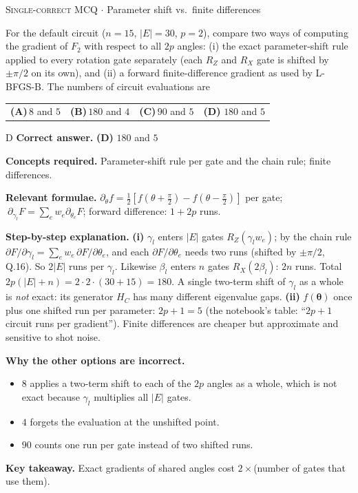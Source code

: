 \documentclass[11pt,a4paper]{article}
\newcommand{\optlabel}[1]{\textbf{(#1)}}
\newcommand{\correctlabel}[1]{\textcolor{okgreen}{\textbf{(#1)}\,\ding{51}}}
\newenvironment{qitem}[1]{\begin{list}{}{\setlength{\leftmargin}{3.3em}\setlength{\labelwidth}{3.1em}%
  \setlength{\labelsep}{0.2em}\setlength{\topsep}{3pt}\setlength{\parsep}{3pt}}\item[\textbf{Q.#1}\hfill]}{\end{list}}
\newcommand{\qsep}{\par\vspace{2pt}{\color{black!15}\hrule}\vspace{4pt}}
\newcommand{\qmeta}[2]{{\footnotesize\color{black!60}\textsc{#1} \;$\cdot$\; #2}\par}
\begin{document}
\begin{qitem}{63}
\qmeta{Single-correct MCQ}{Parameter shift vs.\ finite differences}
For the default circuit ($n = 15$, $|E| = 30$, $p = 2$), compare two ways of computing the gradient of $F_2$ with respect to
all $2p$ angles: (i) the exact parameter-shift rule applied to every rotation gate separately (each $R_Z$ and $R_X$ gate is shifted
by $\pm\pi/2$ on its own), and (ii) a forward finite-difference gradient as used by L-BFGS-B. The numbers of circuit evaluations are
\par\smallskip\noindent\begin{tabularx}{\linewidth}{@{}*{4}{L}@{}}
\optlabel{A}\,$8$ and $5$ & \optlabel{B}\,$180$ and $4$ & \optlabel{C}\,$90$ and $5$ & \correctlabel{D}\,$180$ and $5$
\end{tabularx}
\end{qitem}
\begin{solbox}{D}
\textbf{\color{brand}Correct answer.} \textcolor{okgreen}{\textbf{(D)}} $180$ and $5$

\textbf{\color{brand}Concepts required.} Parameter-shift rule per gate and the chain rule; finite differences.

\textbf{\color{brand}Relevant formulae.} $\partial_\theta f = \tfrac12[f(\theta + \tfrac\pi2) - f(\theta - \tfrac\pi2)]$ per gate; $\ \partial_{\gamma_l}F = \sum_e w_e\partial_{\theta_e}F$; forward difference: $1 + 2p$ runs.

\textbf{\color{brand}Step-by-step explanation.} \textbf{(i)} $\gamma_l$ enters $|E|$ gates $R_Z(\gamma_lw_e)$; by the chain rule $\partial F/\partial\gamma_l = \sum_e w_e\,\partial F/\partial\theta_e$, and each
$\partial F/\partial\theta_e$ needs two runs (shifted by $\pm\pi/2$, Q.16). So $2|E|$ runs per $\gamma_l$. Likewise $\beta_l$ enters $n$ gates
$R_X(2\beta_l)$: $2n$ runs. Total $2p(|E| + n) = 2\cdot2\cdot(30 + 15) = 180$.
A single two-term shift of $\gamma_l$ as a whole is \emph{not} exact: its generator $H_C$ has many different eigenvalue gaps.
\textbf{(ii)} $f(\boldsymbol\theta)$ once plus one shifted run per parameter: $2p + 1 = 5$ (the notebook's table: ``$2p+1$ circuit runs per gradient'').
Finite differences are cheaper but approximate and sensitive to shot noise.

\textbf{\color{brand}Why the other options are incorrect.}
\begin{itemize}[leftmargin=2.4em, itemsep=1pt, topsep=2pt]
\item[\textbf{(A)}] $8$ applies a two-term shift to each of the $2p$ angles as a whole, which is not exact because $\gamma_l$ multiplies all $|E|$ gates.
\item[\textbf{(B)}] $4$ forgets the evaluation at the unshifted point.
\item[\textbf{(C)}] $90$ counts one run per gate instead of two shifted runs.
\end{itemize}
\textbf{\color{brand}Key takeaway.} Exact gradients of shared angles cost $2\times$(number of gates that use them).
\end{solbox}
\qsep
\end{document}
